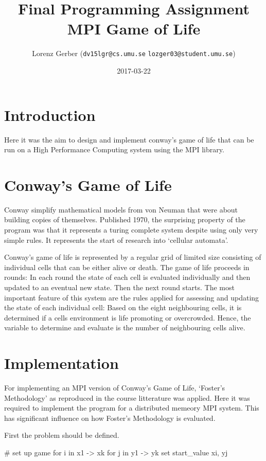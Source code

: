 \documentclass[a4paper,11pt,twoside]{article}
\title{Final Programming Assignment\\ MPI Game of Life}
\author{Lorenz Gerber ({\tt{dv15lgr@cs.umu.se}} {\tt{lozger03@student.umu.se}})}
\date{2017-03-22}
\begin{document}
\lstset{language=C}
\maketitle
\thispagestyle{empty}
\newpage
\tableofcontents
\thispagestyle{empty}
\newpage

\clearpage
{}

\section{Introduction}
Here it was the aim to design and implement conway's game of life that can be run on a High Performance Computing system using the MPI library. 
\section{Conway's Game of Life}
Conway
simplify mathematical models from von Neuman that were about building copies of themselves. Published 1970, the surprising property of the program was that it represents a turing complete system despite using only very simple rules. It represents the start of research into `cellular automata'.

Conway's game of life is represented by a regular grid of limited size consisting of individual cells that can be either alive or death. The game of life proceeds in rounds: In each round the state of each cell is evaluated individually and then updated to an eventual new state. Then the next round starts. The most important feature of this system are the rules applied for assessing and updating the state of each individual cell: Based on the eight neighbouring cells, it is determined if a cells environment is life promoting or overcrowded. Hence, the variable to determine and evaluate is the number of neighbouring cells alive.       

\section{Implementation}
For implementing an MPI version of Conway's Game of Life, `Foster's Methodology' as reproduced in the course litterature \cite[p. 66]{pacheco2011} was applied. Here it was required to implement the program for a distributed memeory MPI system. This has significant influence on how Foster's Methodology is evaluated.

First the problem should be defined.

# set up game
for i in x1 ->  xk {
  for j in y1 -> yk {
    set start_value xi, yj
  }
}
\end{document}
